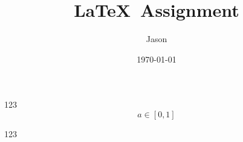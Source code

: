 \documentclass{assignment}
\title{\LaTeX\ Assignment}
\author{Jason}
\date{\today}
\institute{School of Mathematical Science\\Tongji University}
\begin{document}
    \maketitle

    \begin{problem}
        123
        \begin{equation}
            a\in[0, 1]
        \end{equation}
    \end{problem}

    \clearpage
    
    123
\end{document}
